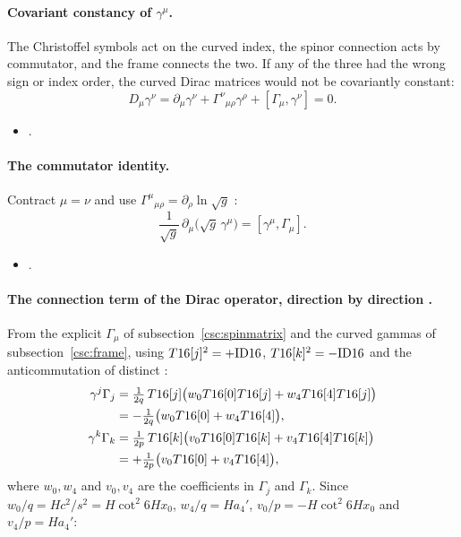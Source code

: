 \paragraph{Covariant constancy of $\gamma^\mu$.} The Christoffel symbols act on the curved index,
the spinor connection acts by commutator, and the frame connects the two. If any of the three had
the wrong sign or index order, the curved Dirac matrices would not be covariantly constant:
\begin{equation}
  D_\mu\gamma^\nu=\partial_\mu\gamma^\nu+\Gamma^\nu{}_{\mu\rho}\gamma^\rho+[\Gamma_\mu,\gamma^\nu]=0 .
\end{equation}
\begin{itemize}
  \item {} .
\end{itemize}

\paragraph{The commutator identity.} Contract $\mu=\nu$ and use
$\Gamma^\mu{}_{\mu\rho}=\partial_\rho\ln\sqrt g$ \cfderived:
\begin{equation}\label{csc:eq:commutator}
  \frac{1}{\sqrt g}\,\partial_\mu\bigl(\sqrt g\,\gamma^\mu\bigr)=[\gamma^\mu,\Gamma_\mu] .
\end{equation}
\begin{itemize}
  \item {} .
\end{itemize}

\paragraph{The connection term of the Dirac operator, direction by direction \cfderived.} From the
explicit $\Gamma_\mu$ of subsection~\ref{csc:spinmatrix} and the curved gammas of
subsection~\ref{csc:frame}, using $T16[j]^2=+\mathrm{ID16}$, $T16[k]^2=-\mathrm{ID16}$ and the anticommutation of
distinct :
\begin{align}
  \gamma^j\Gamma_j&=\tfrac{1}{2q}\,T16[j]\bigl(w_0T16[0]T16[j]+w_4T16[4]T16[j]\bigr)\notag\\
    &=-\tfrac{1}{2q}\bigl(w_0T16[0]+w_4T16[4]\bigr),\\
  \gamma^k\Gamma_k&=\tfrac{1}{2p}\,T16[k]\bigl(v_0T16[0]T16[k]+v_4T16[4]T16[k]\bigr)\notag\\
    &=+\tfrac{1}{2p}\bigl(v_0T16[0]+v_4T16[4]\bigr),
\end{align}
where $w_0,w_4$ and $v_0,v_4$ are the coefficients in $\Gamma_j$ and $\Gamma_k$. Since
$w_0/q=Hc^2/s^2=H\cot^2 6Hx_0$, $w_4/q=Ha_4'$, $v_0/p=-H\cot^2 6Hx_0$ and $v_4/p=Ha_4'$:

